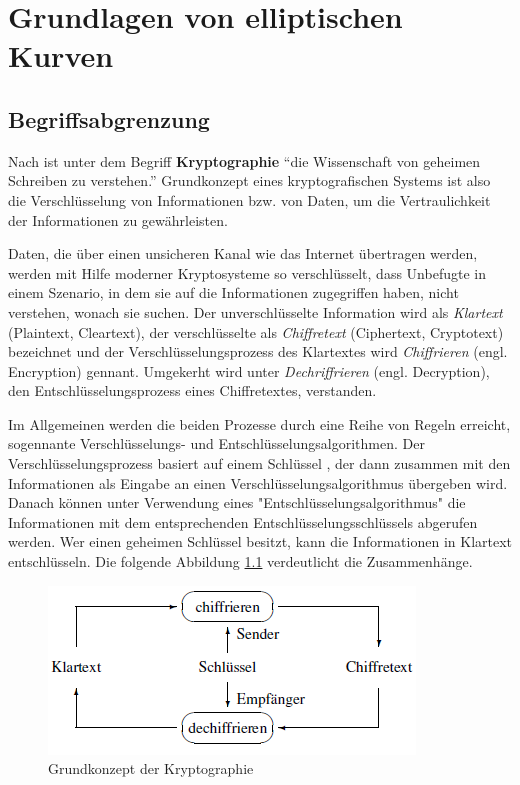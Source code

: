 \chapter{Grundlagen von elliptischen Kurven}

\section{Begriffsabgrenzung}


Nach \cite{damer} ist unter dem Begriff  \textbf{Kryptographie} \enquote{die Wissenschaft von geheimen Schreiben zu verstehen.} Grundkonzept eines kryptografischen Systems ist also die Verschlüsselung von Informationen bzw. von Daten, um die Vertraulichkeit der Informationen zu gewährleisten.

Daten, die über einen unsicheren Kanal wie das Internet übertragen werden, werden mit Hilfe moderner Kryptosysteme so verschlüsselt, dass Unbefugte in einem Szenario, in dem sie auf die Informationen zugegriffen haben, nicht verstehen, wonach sie suchen\cite{moVarol}. 
Der unverschlüsselte Information wird als \textit{Klartext} (Plaintext, Cleartext), der verschlüsselte als \textit{Chiffretext} (Ciphertext, Cryptotext) bezeichnet und der Verschlüsselungsprozess des Klartextes wird \textit{Chiffrieren} (engl. Encryption) gennant. Umgekerht wird unter \textit{Dechriffrieren} (engl. Decryption), den Entschlüsselungsprozess eines Chiffretextes, verstanden.

Im Allgemeinen werden die beiden Prozesse durch eine Reihe von Regeln erreicht, sogennante Verschlüsselungs- und Entschlüsselungsalgorithmen. Der Verschlüsselungsprozess basiert auf einem Schlüssel , der dann zusammen mit den Informationen als Eingabe an einen Verschlüsselungsalgorithmus übergeben wird. 
Danach können unter Verwendung eines "Entschlüsselungsalgorithmus" die Informationen mit dem entsprechenden Entschlüsselungsschlüssels abgerufen werden. Wer einen geheimen Schlüssel besitzt, kann die Informationen in Klartext entschlüsseln\cite{moVarol}. Die folgende Abbildung \ref{konzept} verdeutlicht die Zusammenhänge.

\begin{figure}
    \centering
    \includegraphics[width = 0.5 \textwidth]{Graphics/Cipher.png}
    \caption{Grundkonzept der Kryptographie}
    \label{konzept}
\end{figure}


